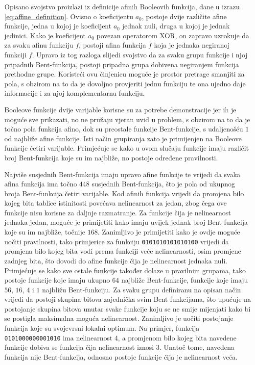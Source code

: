 Opisano svojstvo proizlazi iz definicije afinih Booleovih funkcija, dane u izrazu \eqref{eq:affine_definition}.
Ovisno o koeficijentu $a_0$, postoje dvije različite afine funkcije, jedna u kojoj je koeficijent $a_0$ jednak nuli, druga u kojoj je jednak jedinici.
Kako je koeficijent $a_0$ povezan operatorom XOR, on zapravo uzrokuje da za svaku afinu funkciju $f$, postoji afina funkcija $\overline{f}$ koja je jednaka negiranoj funkciji $f$.
Upravo iz tog razloga slijedi svojstvo da za svaku grupu funkcije i njoj pripadnih Bent-funkcija, postoji pripadna grupa dobivena negiranjem funkcija prethodne grupe.
Koristeći ovu činjenicu moguće je prostor pretrage smanjiti za pola, s obzirom na to da je dovoljno provjeriti jednu funkciju te ona ujedno daje informacije i za njoj komplementarnu funkciju.

Booleove funkcije dvije varijable korisne su za potrebe demonstracije jer ih je moguće sve prikazati, no ne pružaju vjeran uvid u problem, s obzirom na to da je točno pola funkcija afino, dok su preostale funkcije Bent-funkcije, s udaljenošću $1$ od najbliže afine funkcije.
Isti način grupiranja zato je primijenjen na Booleove funkcije četiri varijable.
Primjećuje se kako u ovom slučaju funkcije imaju različit broj Bent-funkcija koje su im najbliže, no postoje određene pravilnosti.

Najviše susjednih Bent-funkcija imaju upravo afine funkcije te vrijedi da svaka afina funkcija ima točno $448$ susjednih Bent-funkcija, što je pola od ukupnog broja Bent-funkcija četiri varijable.
Kod afinih funkcija vrijedi da promjena bilo kojeg bita tablice istinitosti povećava nelinearnost za jedan, zbog čega ove funkcije nisu korisne za daljnje razmatranje.
Za funkcije čija je nelinearnost jednaka jedan, moguće je primijetiti kako imaju uvijek jednak broj Bent-funkcija koje su im najbliže, točnije $168$.
Zanimljivo je primijetiti kako je ovdje moguće uočiti pravilnosti, tako primjerice za funkciju \texttt{0101010101010100} vrijedi da promjena bilo kojeg bita vodi prema funkciji veće nelinearnosti, osim promjene zadnjeg bita, što dovodi do afine funkcije čija je nelinearnost jednaka nuli.
Primjećuje se kako sve ostale funkcije također dolaze u pravilnim grupama, tako postoje funkcije koje imaju ukupno $64$ najbliže Bent-funkcije, funkcije koje imaju $56$, $16$, $4$ i $1$ najbližu Bent-funkciju.
Za svaku grupu definiranu na opisan način vrijedi da postoji skupina bitova zajednička svim Bent-funkcijama, što upućuje na postojanje skupina bitova unutar svake funkcije koju se ne smije mijenjati kako bi se postigla maksimalna moguća nelinearnost.
Zanimljivo je uočiti postojanje funkcija koje su svojevrsni lokalni optimum.
Na primjer, funkcija \texttt{0101000000001010} ima nelinearnost $4$, a promjenom bilo kojeg bita navedene funkcije dobiva se funkcija čija nelinearnost iznosi $3$.
Unatoč tome, navedena funkcija nije Bent-funkcija, odnosno postoje funkcije čija je nelinearnost veća.

